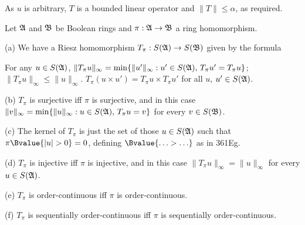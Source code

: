 {




\noindent As $u$ is arbitrary, $T$ is a bounded linear operator and
$\|T\|\le\alpha$, as required.
}%

 Let $\frak A$ and $\frak B$ be Boolean rings
and $\pi:\frak A\to\frak B$ a ring homomorphism.

(a) We have a Riesz homomorphism $T_{\pi}:S(\frak A)\to S(\frak B)$
given by the formula


\noindent For any $u\in S(\frak A)$, $\|T_{\pi}u\|_{\infty}
=\min\{\|u'\|_{\infty}:u'\in S(\frak A),\,T_{\pi}u'=T_{\pi}u\}$;
 $\|T_{\pi}u\|_{\infty}\le\|u\|_{\infty}$.
 $T_{\pi}(u\times u')=T_{\pi}u\times T_{\pi}u'$
for all $u$, $u'\in S(\frak A)$.

(b) $T_{\pi}$ is surjective iff $\pi$ is surjective, and in this case
$\|v\|_{\infty}=\min\{\|u\|_{\infty}:u\in S(\frak A),\,T_{\pi}u=v\}$ for
every
$v\in S(\frak B)$.

(c) The kernel of $T_{\pi}$ is just the set of those $u\in S(\frak A)$
such that $\pi\Bvalue{|u|>0}=0$, defining $\Bvalue{\ldots>\ldots}$ as in
361Eg.

(d) $T_{\pi}$ is injective iff $\pi$ is injective, and in this case
$\|T_{\pi}u\|_{\infty}=\|u\|_{\infty}$ for every $u\in S(\frak A)$.

(e) $T_{\pi}$ is order-continuous iff $\pi$ is order-continuous.

(f) $T_{\pi}$ is sequentially order-continuous iff $\pi$ is sequentially
order-continuous.

